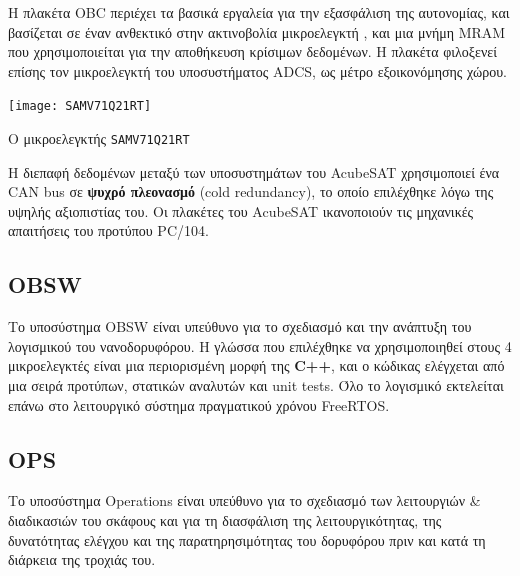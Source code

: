 \documentclass[a4paper,nobib]{tufte-book}
\begin{document}
Η πλακέτα \ac{OBC} περιέχει τα βασικά εργαλεία για την εξασφάλιση της αυτονομίας, και βασίζεται σε έναν ανθεκτικό στην ακτινοβολία μικροελεγκτή , και μια μνήμη \acs{MRAM} που χρησιμοποιείται για την αποθήκευση κρίσιμων δεδομένων. Η πλακέτα φιλοξενεί επίσης τον μικροελεγκτή του υποσυστήματος \ac{ADCS}, ως μέτρο εξοικονόμησης χώρου.

\begin{marginfigure}
	\centering
	\texttt{[image: SAMV71Q21RT]}
	\caption{Ο μικροελεγκτής \texttt{SAMV71Q21RT}}
	\label{fig:samv71}
\end{marginfigure}

Η διεπαφή δεδομένων μεταξύ των υποσυστημάτων του AcubeSAT χρησιμοποιεί ένα \ac{CAN} bus σε \textbf{ψυχρό πλεονασμό} (cold redundancy), το οποίο επιλέχθηκε λόγω της υψηλής αξιοπιστίας του. \autocite{bouwmeester_survey_implementation_2017} Οι πλακέτες του AcubeSAT ικανοποιούν τις μηχανικές απαιτήσεις του προτύπου PC/104. \autocite{PC104}

\subsection{\acf{OBSW}}


Το υποσύστημα \ac{OBSW} είναι υπεύθυνο για το σχεδιασμό και την ανάπτυξη του λογισμικού του νανοδορυφόρου. Η γλώσσα που επιλέχθηκε να χρησιμοποιηθεί στους 4 μικροελεγκτές είναι μια περιορισμένη μορφή της \textbf{C++}, και ο κώδικας ελέγχεται από μια σειρά προτύπων, στατικών αναλυτών και unit tests. \autocite{DDJF_OBSW} Όλο το λογισμικό εκτελείται επάνω στο λειτουργικό σύστημα πραγματικού χρόνου Free\acs{RTOS}.


\subsection{\acf{OPS}}

Το υποσύστημα Operations είναι υπεύθυνο για το σχεδιασμό των λειτουργιών \& διαδικασιών του σκάφους και για τη διασφάλιση της λειτουργικότητας, της δυνατότητας ελέγχου και της παρατηρησιμότητας του δορυφόρου πριν και κατά τη διάρκεια της τροχιάς του.
\end{document}
